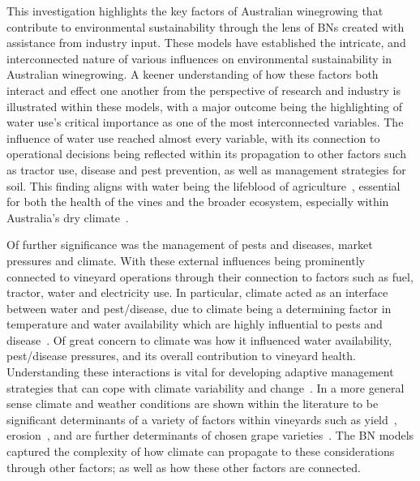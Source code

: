 This investigation highlights the key factors of Australian winegrowing that contribute to  environmental sustainability through the lens of BNs created with assistance from industry input. These models have established the intricate, and interconnected nature of various influences on environmental sustainability in Australian winegrowing. A keener understanding of how these factors both interact and effect one another from the perspective of research and industry is illustrated within these models, with a major outcome being the highlighting of water use's critical importance as one of the most interconnected variables. The influence of water use reached almost every variable, with its connection to operational decisions being reflected within its propagation to other factors such as tractor use, disease and pest prevention, as well as management strategies for soil. This finding aligns with water being the lifeblood of agriculture~\cite{chawlaWaterProductivityAgriculture2023}, essential for both the health of the vines and the broader ecosystem, especially within Australia's dry climate~\cite{australianbureauofstatisticsWaterUseAustralian2021}.

Of further significance was the management of pests and diseases, market pressures and climate. With these external influences being prominently connected to vineyard operations through their connection to factors such as fuel, tractor, water and electricity use. In particular, climate acted as an interface between water and pest/disease, due to climate being a determining factor in temperature and water availability which are highly influential to pests and disease~\cite{boisClimateVsGrapevine2017}. Of great concern to climate was how it influenced water availability, pest/disease pressures, and its overall contribution to vineyard health. Understanding these interactions is vital for developing adaptive management strategies that can cope with climate variability and change~\cite{agostaRegionalClimateVariability2012,alsafadiFutureScenariosBioclimatic2023,barriguinhaVineyardYieldEstimation2021,sharmaChapterImpactClimate2014}. In a more general sense climate and weather conditions are shown within the literature to be significant determinants of a variety of factors within vineyards such as yield~\cite{barriguinhaVineyardYieldEstimation2021,antonComparativeStudyRisk2012}, erosion~\cite{biddoccuEvaluationSoilErosion2020,doi:10.1177/0309133319861833}, and are further determinants of chosen grape varieties~\cite{topferGrapeVarietiesAre2022, petriashviliImpactClimateChange2023}. The BN models captured the complexity of how climate can propagate to these considerations through other factors; as well as how these other factors are connected.

